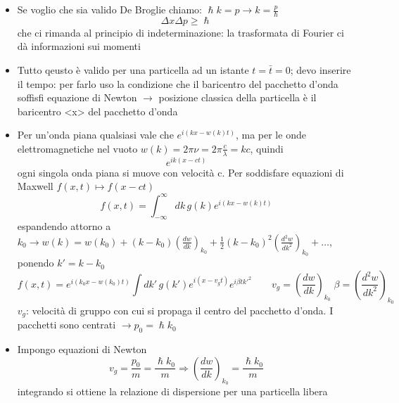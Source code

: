 \documentclass[a4paper,11pt]{report}
\theoremstyle{remark}
\theoremstyle{definition}
\begin{document}
\begin{itemize}
\begin{equation*}
    \end{equation*}
    \item Se voglio che sia valido De Broglie chiamo: $\hslash k = p \rightarrow k = \frac{p}{\hslash}$
    \begin{equation*}
        \Delta x \Delta p \geq \hslash
    \end{equation*}
    che ci rimanda al principio di indeterminazione: la trasformata di Fourier ci dà informazioni sui momenti
    \item Tutto qeusto è valido per una particella ad un istante $t = \bar{t} = 0$; devo inserire il tempo: per farlo uso la condizione che il baricentro del pacchetto d'onda soffisfi equazione di Newton $\rightarrow$ posizione classica della particella è il baricentro <x> del pacchetto d'onda
    \item Per un'onda piana qualsiasi vale che $e^{i(kx - w(k)t)}$, ma per le onde elettromagnetiche nel vuoto $w(k) = 2\pi \nu = 2\pi \frac{c}{\lambda} = kc$, quindi
    \begin{equation*}
        e^{ik(x-ct)}
    \end{equation*}
    ogni singola onda piana si muove con velocità c. Per soddisfare equazioni di Maxwell $f(x,t) \mapsto f(x-ct)$
    \begin{equation*}
        f(x,t) = \int_{-\infty}^\infty dk \, g(k) e^{i(kx-w(k)t)}
    \end{equation*}
    espandendo attorno a $k_0 \rightarrow w(k)= w(k_0) + (k-k_0)\left(\frac{dw}{dk}\right)_{k_0} + \frac{1}{2} {(k-k_0)}^2 \left(\frac{d^2w}{dk^2}\right)_{k_0} + \dots $, ponendo $k' = k -k_0$
    \begin{equation*}
        f(x,t) = e^{i(k_0x - w(k_0)t)} \int dk' \, g(k')e^{i(x-v_gt)}e^{i\beta t k'^2} \qquad v_g = \left(\frac{dw}{dk}\right)_{k_0} \; \beta = \left(\frac{d^2w}{dk^2}\right)_{k_0}
    \end{equation*}
    $v_g$: velocità di gruppo con cui si propaga il centro del pacchetto d'onda. \newline
    I pacchetti sono centrati $\rightarrow p_0 = \hslash k_0$
    \item Impongo equazioni di Newton
    \begin{equation*}
        v_g = \frac{p_0}{m} = \frac{\hslash k_0}{m} \Rightarrow \left(\frac{dw}{dk}\right)_{k_0} = \frac{\hslash k_0}{m}
    \end{equation*}
    integrando si ottiene la relazione di dispersione per una particella libera
    \begin{equation*}

\end{equation*}
\end{itemize}
\end{document}
